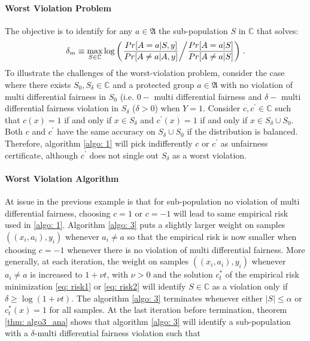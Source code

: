 \documentclass{article}
\begin{document}
\paragraph{Worst Violation Problem}
The objective is to identify for any $a\in \mathfrak{A}$ the sub-population $S$ in $\mathbb{C}$ that solves:
\begin{equation}
\label{eq: wvio}
    \delta_{m} \equiv \max_{S\in \mathbb{C}}\log\left(\left.\frac{Pr[A=a|S, y]}{Pr[A\neq a|A, y]}\middle/\frac{Pr[A=a|S]}{Pr[A\neq a|S]}\right)\right. .
\end{equation}
To illustrate the challenges of the worst-violation problem, consider the case where there exists $S_{0}, S_{\delta}\in \mathbb{C}$ and a protected group $a\in \mathfrak{A}$ with no violation of multi differential fairness in $S_{0}$ (i.e. $0-$ multi differential fairness and $\delta-$ multi differential fairness violation in $S_{\delta}$ ($\delta >0$) when $Y=1$.  Consider $c, c^{'}\in \mathbb{C}$ such that $c(x)=1$ if and only if $x\in S_{\delta}$ and $c^{'}(x)=1$ if and only if $x\in S_{\delta}\cup S_{0}$. Both $c$ and $c^{'}$ have the same accuracy on $S_{\delta}\cup S_{0}$ if the distribution is balanced. Therefore, algorithm \ref{algo: 1} will pick indifferently $c$ or $c^{'}$ as unfairness certificate, although $c^{'}$ does not single out $S_{\delta}$ as a worst violation. 

\paragraph{Worst Violation Algorithm}
At issue in the previous example is that for sub-population no violation of multi differential fairness, choosing $c=1$ or $c=-1$ will lead to same empirical risk used in \ref{algo: 1}. Algorithm \ref{algo: 3} puts a slightly larger weight on samples $((x_{i}, a_{i}), y_{i})$ whenever $a_{i}\neq a$ so that the empirical risk is now smaller when choosing $c=-1$ whenever there is no violation of multi differential fairness.  More generally, at each iteration, the weight on samples $((x_{i}, a_{i}), y_{i})$ whenever $a_{i}\neq a$ is increased to $1 + \nu t$, with $\nu > 0$ and the solution $c_{t}^{*}$ of the empirical risk minimization \eqref{eq: risk1} or \eqref{eq: risk2} will identify $S\in \mathbb{C}$ as a violation only if $\delta \geq \log(1 + \nu t)$. The algorithm \ref{algo: 3} terminates whenever either $|S|\leq \alpha$ or $c^{*}_{t}(x)=1$ for all samples. At the last iteration before termination, theorem \ref{thm: algo3_ana} shows that algorithm \ref{algo: 3} will identify a sub-population with a $\delta$-multi differential fairness violation such that
\end{document}

